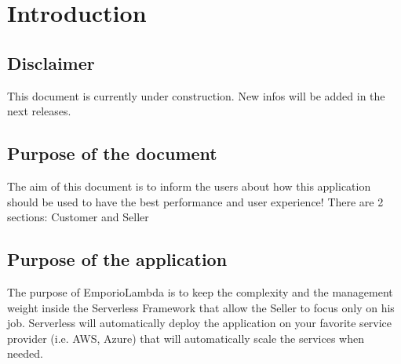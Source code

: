 \section{Introduction} \label{_introduction}
\subsection{Disclaimer}
This document is currently under construction. New infos will be added in the next releases.

\subsection{Purpose of the document}
The aim of this document is to inform the users about how this application should be used to have the best performance and user experience! There are 2 sections: Customer and Seller

\subsection{Purpose of the application}
The purpose of EmporioLambda is to keep the complexity and the management weight inside the Serverless Framework that allow the Seller to focus only on his job. Serverless will automatically deploy the application on your favorite service provider (i.e. AWS, Azure) that will automatically scale the services when needed.